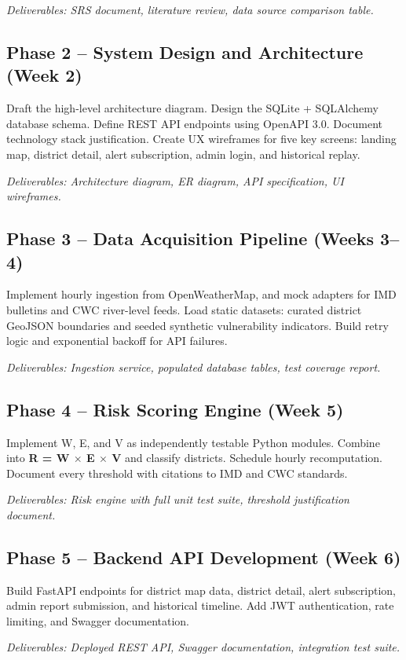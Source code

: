 \documentclass[12pt,a4paper]{report}
\begin{document}
\textit{Deliverables: SRS document, literature review, data source comparison table.}

\subsection{Phase 2 -- System Design and Architecture (Week 2)}
Draft the high-level architecture diagram. Design the SQLite + SQLAlchemy database schema. Define REST API endpoints using OpenAPI 3.0. Document technology stack justification. Create UX wireframes for five key screens: landing map, district detail, alert subscription, admin login, and historical replay.

\textit{Deliverables: Architecture diagram, ER diagram, API specification, UI wireframes.}

\subsection{Phase 3 -- Data Acquisition Pipeline (Weeks 3--4)}
Implement hourly ingestion from OpenWeatherMap, and mock adapters for IMD bulletins and CWC river-level feeds. Load static datasets: curated district GeoJSON boundaries and seeded synthetic vulnerability indicators. Build retry logic and exponential backoff for API failures.

\textit{Deliverables: Ingestion service, populated database tables, test coverage report.}

\subsection{Phase 4 -- Risk Scoring Engine (Week 5)}
Implement W, E, and V as independently testable Python modules. Combine into \textbf{R = W $\times$ E $\times$ V} and classify districts. Schedule hourly recomputation. Document every threshold with citations to IMD and CWC standards.

\textit{Deliverables: Risk engine with full unit test suite, threshold justification document.}

\subsection{Phase 5 -- Backend API Development (Week 6)}
Build FastAPI endpoints for district map data, district detail, alert subscription, admin report submission, and historical timeline. Add JWT authentication, rate limiting, and Swagger documentation.

\textit{Deliverables: Deployed REST API, Swagger documentation, integration test suite.}
\end{document}
